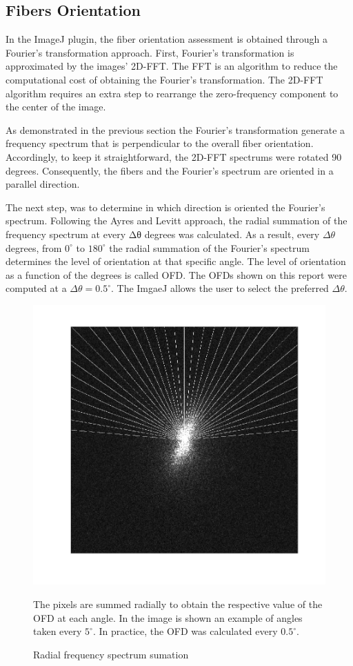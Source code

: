 \documentclass[12pt,a4paper]{article}
\begin{document}
\subsection{Fibers Orientation}

In the ImageJ plugin, the fiber orientation assessment is obtained through a Fourier’s transformation approach. First, Fourier's transformation is approximated by the images' 2D-FFT. The FFT is an algorithm to reduce the computational cost of obtaining the Fourier’s transformation. The 2D-FFT algorithm requires an extra step to rearrange the zero-frequency component to the center of the image.

As demonstrated in the previous section the Fourier's transformation generate a frequency spectrum that is perpendicular to the overall fiber orientation. Accordingly, to keep it straightforward, the 2D-FFT spectrums were rotated 90 degrees. Consequently, the fibers and the Fourier’s spectrum are oriented in a parallel direction.

The next step, was to determine in which direction is oriented the Fourier’s spectrum. Following the Ayres and Levitt approach, the radial summation of the frequency spectrum at every Δθ degrees was calculated. As a result, every $\Delta\theta$ degrees, from $0^{\circ}$ to $180^{\circ}$ the radial summation of the Fourier’s spectrum determines the level of orientation at that specific angle. The level of orientation as a function of the degrees is called OFD.  The OFDs shown on this report were computed at a $\Delta\theta = 0.5^{\circ}$. The ImgaeJ allows the user to select the preferred $\Delta\theta$.

\begin{figure}
  \includegraphics[width=\linewidth]{FiguresDisertation/figure3.jpg}
  \caption{Radial frequency spectrum sumation}
 \medskip
  \small
  The pixels are summed radially to obtain the respective value of the OFD at each angle. In the image is shown an example of angles taken every $5^{\circ}$. In practice, the OFD was calculated every $0.5^{\circ}$.
\end{figure}
\end{document}

